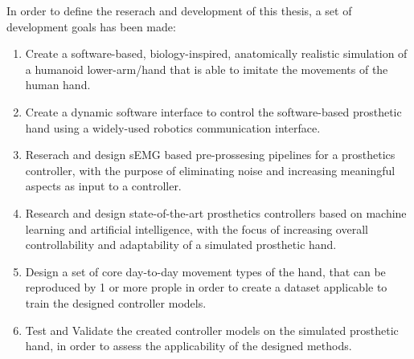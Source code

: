 \documentclass[../main.tex]{subfiles}
\begin{document}
In order to define the reserach and development of this thesis, a set of development goals has been made:

\begin{enumerate}
\item Create a software-based, biology-inspired, anatomically realistic simulation of a humanoid lower-arm/hand that is able to imitate the movements of the human hand.
\item Create a dynamic software interface to control the software-based prosthetic hand using a widely-used robotics communication interface.
\item Reserach and design sEMG based pre-prossesing pipelines for a prosthetics controller, with the purpose of eliminating noise and increasing meaningful aspects as input to a controller. 
\item Research and design state-of-the-art prosthetics controllers based on machine learning and artificial intelligence, with the focus of increasing overall controllability and adaptability of a simulated prosthetic hand.
\item Design a set of core day-to-day movement types of the hand, that can be reproduced by 1 or more prople in order to create a dataset applicable to train the designed controller models.
\item Test and Validate the created controller models on the simulated prosthetic hand, in order to assess the applicability of the designed methods.
\end{enumerate}
\end{document}
